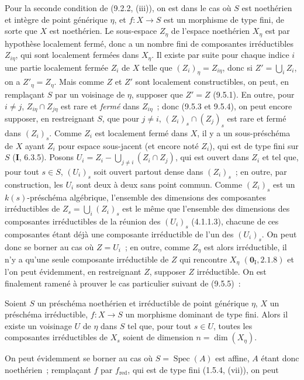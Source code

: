 Pour la seconde condition de (9.2.2, (iii)), on est dans le cas où $S$ est
noethérien et intègre de point générique $\eta$, et $f:X\to S$ est un
morphisme de type fini, de sorte que $X$ est noethérien. Le sous-espace
$Z_\eta$ de l'espace noethérien $X_\eta$ est par hypothèse localement fermé,
donc a un nombre fini de composantes irréductibles $Z_{i\eta}$, qui sont
localement fermées dans $X_\eta$. Il existe par suite pour chaque indice $i$
une partie localement fermée $Z_i$ de $X$ telle que $(Z_i)_\eta=Z_{i\eta}$,
donc si $Z'=\bigcup_i Z_i$, on a $Z'_\eta=Z_\eta$. Mais comme $Z$ et $Z'$ sont
localement constructibles, on peut, en remplaçant $S$ par un voisinage de
$\eta$, supposer que $Z'=Z$ (9.5.1). En outre, pour $i\neq j$,
$Z_{i\eta}\cap Z_{j\eta}$ est rare et \emph{fermé} dans $Z_{i\eta}$~; donc
(9.5.3 et 9.5.4), on peut encore supposer, en restreignant $S$, que pour
$j\neq i$, $(Z_i)_s\cap(Z_j)_s$ est rare et fermé dans $(Z_i)_s$. Comme $Z_i$
est localement fermé dans $X$, il y a un sous-préschéma de $X$ ayant $Z_i$
pour espace sous-jacent (et encore noté $Z_i$), qui est de type fini sur
$S$ (\textbf{I}, 6.3.5). Posons
$U_i=Z_i-\bigcup_{j\neq i}(Z_i\cap Z_j)$, qui est ouvert dans $Z_i$ et tel que,
pour tout $s\in S$, $(U_i)_s$ soit ouvert partout dense dans $(Z_i)_s$~; en
outre, par construction, les $U_i$ sont deux à deux sans point commun. Comme
$(Z_i)_s$ est un $k(s)$-préschéma algébrique, l'ensemble des dimensions des
composantes irréductibles de $Z_s=\bigcup_i(Z_i)_s$ est le même que l'ensemble
des dimensions des composantes irréductibles de la réunion des $(U_i)_s$
(4.1.1.3), chacune de ces composantes étant déjà une composante irréductible
de l'un des $(U_i)_s$. On peut donc se borner au cas où $Z=U_i$~; en outre,
comme $Z_\eta$ est alors irréductible, il n'y a qu'une seule composante
irréductible de $Z$ qui rencontre $X_\eta$ $(\mathbf 0_{\mathrm I},2.1.8)$ et
l'on peut évidemment, en restreignant $Z$, supposer $Z$ irréductible. On est
finalement ramené à prouver le cas particulier suivant de (9.5.5)~:

\begin{corollary}[9.5.6]
\label{IV.9.5.6-fr}
Soient $S$ un préschéma noethérien et irréductible de point générique $\eta$,
$X$ un préschéma irréductible, $f:X\to S$ un morphisme dominant de type fini.
Alors il existe un voisinage $U$ de $\eta$ dans $S$ tel que, pour tout
$s\in U$, toutes les composantes irréductibles de $X_s$ soient de dimension
$n=\dim(X_\eta)$.
\end{corollary}

On peut évidemment se borner au cas où $S=\operatorname{Spec}(A)$ est affine,
$A$ étant donc noethérien~; remplaçant $f$ par $f_{\mathrm{red}}$, qui est de
type fini (1.5.4, (vii)), on peut

